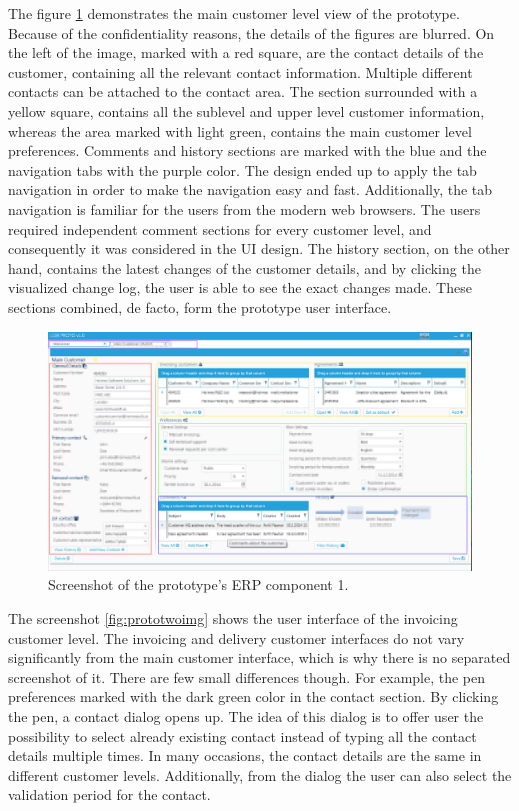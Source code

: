 \documentclass[12pt,a4paper,oneside,pdftex]{report}
\begin{document}
The figure \ref{fig:protooneimg} demonstrates the main customer level view of the prototype. Because of the confidentiality reasons, the details of the figures are blurred. On the left of the image, marked with a red square, are the contact details of the customer, containing all the relevant contact information. Multiple different contacts can be attached to the contact area. The section surrounded with a yellow square, contains all the sublevel and upper level customer information, whereas the area marked with light green, contains the main customer level preferences. Comments and history sections are marked with the blue and the navigation tabs with the purple color. The design ended up to apply the tab navigation in order to make the navigation easy and fast. Additionally, the tab navigation is familiar for the users from the modern web browsers. The users required independent comment sections for every customer level, and consequently it was considered in the UI design. The history section, on the other hand, contains the latest changes of the customer details, and by clicking the visualized change log, the user is able to see the exact changes made. These sections combined, de facto, form the prototype user interface.

\begin{figure}[H]

  	\centerline{
    	   \includegraphics[width=1.3\textwidth]{./images/proto_main.png}
    	   }
  	   \caption{Screenshot of the prototype's ERP component 1.}
	   \label{fig:protooneimg}
\end{figure}

The screenshot \ref{fig:prototwoimg} shows the user interface of the invoicing customer level. The invoicing and delivery customer interfaces do not vary significantly from the main customer interface, which is why there is no separated screenshot of it. There are few small differences though. For example, the pen preferences marked with the dark green color in the contact section. By clicking the pen, a contact dialog opens up. The idea of this dialog is to offer user the possibility to select already existing contact instead of typing all the contact details multiple times. In many occasions, the contact details are the same in different customer levels. Additionally, from the dialog the user can also select the validation period for the contact. 
\end{document}
